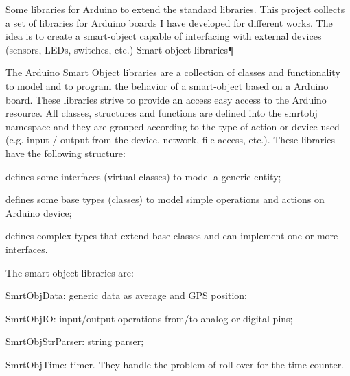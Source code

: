 Some libraries for Arduino to extend the standard libraries. This project collects a set of libraries for Arduino boards I have developed for different works. The idea is to create a smart-\/object capable of interfacing with external devices (sensors, L\+E\+Ds, switches, etc.) Smart-\/object libraries¶

The Arduino Smart Object libraries are a collection of classes and functionality to model and to program the behavior of a smart-\/object based on a Arduino board. These libraries strive to provide an access easy access to the Arduino resource. All classes, structures and functions are defined into the smrtobj namespace and they are grouped according to the type of action or device used (e.\+g. input / output from the device, network, file access, etc.). These libraries have the following structure\+:


\begin{DoxyItemize}
\item defines some interfaces (virtual classes) to model a generic entity;
\item defines some base types (classes) to model simple operations and actions on Arduino device;
\item defines complex types that extend base classes and can implement one or more interfaces.
\end{DoxyItemize}

The smart-\/object libraries are\+:


\begin{DoxyItemize}
\item Smrt\+Obj\+Data\+: generic data as average and G\+P\+S position;
\item Smrt\+Obj\+I\+O\+: input/output operations from/to analog or digital pins;
\item Smrt\+Obj\+Str\+Parser\+: string parser;
\item Smrt\+Obj\+Time\+: timer. They handle the problem of roll over for the time counter. 
\end{DoxyItemize}